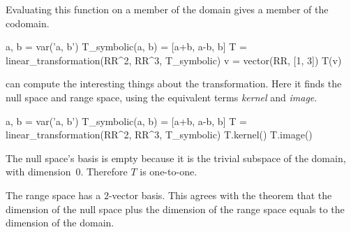 Evaluating this function on a member of the domain gives a member
of the codomain. 
\begin{sageoutput}[d,0,3]
a, b = var('a, b')   
T_symbolic(a, b) = [a+b, a-b, b]         
T = linear_transformation(RR^2, RR^3, T_symbolic)
v = vector(RR, [1, 3])  
T(v)
\end{sageoutput}

\Sage{} can compute the interesting things about the transformation.
Here it finds the null space 
and range space, using the equivalent 
terms \textit{kernel} and \textit{image}.
\begin{sageoutput}[d,0,3;s,4,70,59;s,8,70,59]
a, b = var('a, b')   
T_symbolic(a, b) = [a+b, a-b, b]         
T = linear_transformation(RR^2, RR^3, T_symbolic)
T.kernel()                                       
T.image()                                        
\end{sageoutput}
The null space's basis is empty because 
it is the trivial subspace of the domain,
with dimension~$0$.
Therefore $T$ is one-to-one.

The range space has a $2$-vector basis. 
This agrees with the theorem that
the dimension of the null space plus the dimension of the 
range space equals to the dimension of the domain.


